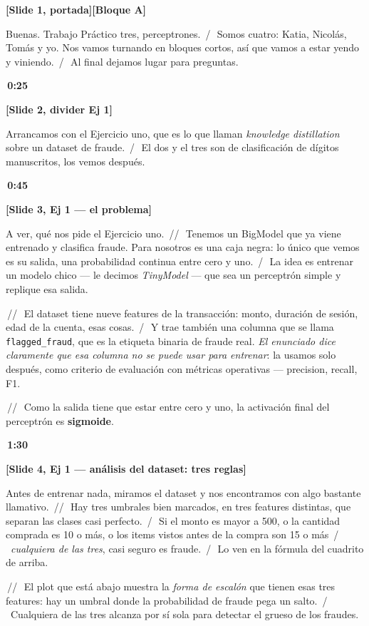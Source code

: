\documentclass[11pt,a4paper]{article}
\newcommand{\code}[1]{\texttt{\textcolor{accent}{#1}}}
\newcommand{\slidenum}[1]{\textcolor{accent}{\textbf{[Slide #1]}}}
\newcommand{\timing}[1]{\textcolor{muted}{\textbf{\,#1\,}}}
\newcommand{\bloque}[1]{\textcolor{muted}{\small\textbf{[Bloque #1]}}}
\newcommand{\enunciado}[1]{\textcolor{warn}{\textit{#1}}}
\newcommand{\pausa}{\textcolor{muted}{\,/\,}}
\newcommand{\Pausa}{\textcolor{muted}{\,/\!/\,}}
\begin{document}
\slidenum{1, portada}\quad \bloque{A}

Buenas. Trabajo Práctico tres, perceptrones. \pausa\ Somos cuatro: Katia, Nicolás, Tomás y yo. Nos vamos turnando en bloques cortos, así que vamos a estar yendo y viniendo. \pausa\ Al final dejamos lugar para preguntas.

\timing{0:25}

\slidenum{2, divider Ej 1}

Arrancamos con el Ejercicio uno, que es lo que llaman \emph{knowledge distillation} sobre un dataset de fraude. \pausa\ El dos y el tres son de clasificación de dígitos manuscritos, los vemos después.

\timing{0:45}

\slidenum{3, Ej 1 — el problema}

A ver, qué nos pide el Ejercicio uno. \Pausa\ Tenemos un BigModel que ya viene entrenado y clasifica fraude. Para nosotros es una caja negra: lo único que vemos es su salida, una probabilidad continua entre cero y uno. \pausa\ La idea es entrenar un modelo chico --- le decimos \emph{TinyModel} --- que sea un perceptrón simple y replique esa salida.

\Pausa\ El dataset tiene nueve features de la transacción: monto, duración de sesión, edad de la cuenta, esas cosas. \pausa\ Y trae también una columna que se llama \code{flagged\_fraud}, que es la etiqueta binaria de fraude real. \enunciado{El enunciado dice claramente que esa columna no se puede usar para entrenar}: la usamos solo después, como criterio de evaluación con métricas operativas --- precision, recall, F1.

\Pausa\ Como la salida tiene que estar entre cero y uno, la activación final del perceptrón es \textbf{sigmoide}.

\timing{1:30}

\slidenum{4, Ej 1 — análisis del dataset: tres reglas}

Antes de entrenar nada, miramos el dataset y nos encontramos con algo bastante llamativo. \Pausa\ Hay tres umbrales bien marcados, en tres features distintas, que separan las clases casi perfecto. \pausa\ Si el monto es mayor a 500, o la cantidad comprada es 10 o más, o los items vistos antes de la compra son 15 o más \pausa\ \emph{cualquiera de las tres}, casi seguro es fraude. \pausa\ Lo ven en la fórmula del cuadrito de arriba.

\Pausa\ El plot que está abajo muestra la \emph{forma de escalón} que tienen esas tres features: hay un umbral donde la probabilidad de fraude pega un salto. \pausa\ Cualquiera de las tres alcanza por sí sola para detectar el grueso de los fraudes.
\end{document}
